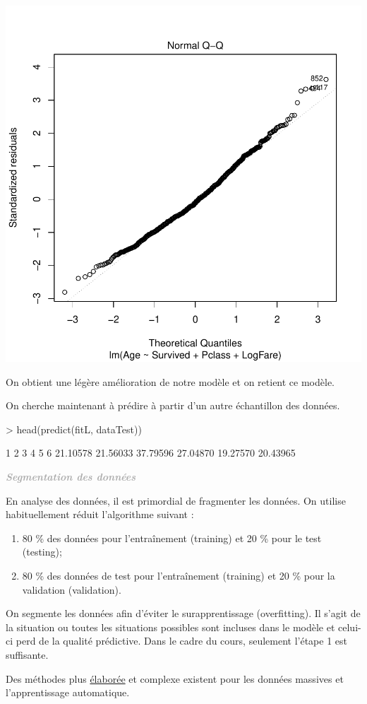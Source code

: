 \documentclass[11pt,french]{report}
\newenvironment{moreInfo}[1]
	{\begin{mdframed}
	\textcolor{darkgray}{\huge \raisebox{-3.5pt}{\faInfo} 
	\hspace{0.5cm} \large\bfseries #1}\\[5pt]
	\normalsize
	\makebox[0.1\textwidth][l]{}	
	\begin{minipage}{10cm}}
	{	\end{minipage}
	\end{mdframed}}
\begin{document}
\includegraphics{notes_de_cours-041}

On obtient une légère amélioration de notre modèle et on retient ce modèle. \newline

On cherche maintenant à prédire à partir d'un autre échantillon des données.

\begin{Schunk}
\begin{Sinput}
> head(predict(fitL, dataTest))
\end{Sinput}
\begin{Soutput}
       1        2        3        4        5        6 
21.10578 21.56033 37.79596 27.04870 19.27570 20.43965 
\end{Soutput}
\end{Schunk}

\begin{moreInfo}{\emph{Segmentation des données}}
      En analyse des données, il est primordial de fragmenter les données. On utilise habituellement réduit l'algorithme suivant :
      \begin{enumerate}
      \item 80 \% des données pour l'entraînement (training) et 20 \% pour le test (testing);
      \item 80 \% des données de test pour l'entraînement  (training) et 20 \% pour la validation (validation). 
      \end{enumerate}
      On segmente les données afin d'éviter le surapprentissage (overfitting). Il s'agit de la situation ou toutes les situations possibles sont incluses dans le modèle et celui-ci perd de la qualité prédictive. 
      Dans le cadre du cours, seulement l'étape 1 est suffisante. \newline
      
      Des méthodes plus \href{https://fr.wikipedia.org/wiki/Validation_croisée}{élaborée} et complexe existent pour les données massives et l'apprentissage automatique.
\end{moreInfo}
\end{document}
